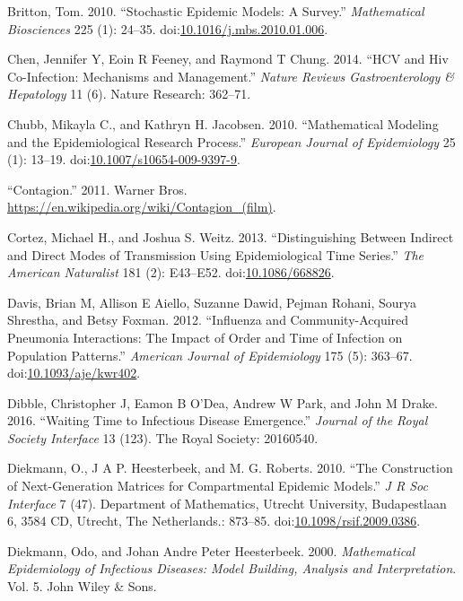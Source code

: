 \documentclass[]{book}
\theoremstyle{definition}
\theoremstyle{definition}
\theoremstyle{definition}
\theoremstyle{remark}
\begin{document}
\hypertarget{ref-britton10a}{}
Britton, Tom. 2010. ``Stochastic Epidemic Models: A Survey.''
\emph{Mathematical Biosciences} 225 (1): 24--35.
doi:\href{https://doi.org/10.1016/j.mbs.2010.01.006}{10.1016/j.mbs.2010.01.006}.

\hypertarget{ref-chen14}{}
Chen, Jennifer Y, Eoin R Feeney, and Raymond T Chung. 2014. ``HCV and
Hiv Co-Infection: Mechanisms and Management.'' \emph{Nature Reviews
Gastroenterology \& Hepatology} 11 (6). Nature Research: 362--71.

\hypertarget{ref-chubb10}{}
Chubb, Mikayla C., and Kathryn H. Jacobsen. 2010. ``Mathematical
Modeling and the Epidemiological Research Process.'' \emph{European
Journal of Epidemiology} 25 (1): 13--19.
doi:\href{https://doi.org/10.1007/s10654-009-9397-9}{10.1007/s10654-009-9397-9}.

\hypertarget{ref-contagionmovie}{}
``Contagion.'' 2011. Warner Bros.
\url{https://en.wikipedia.org/wiki/Contagion_(film)}.

\hypertarget{ref-cortez13}{}
Cortez, Michael H., and Joshua S. Weitz. 2013. ``Distinguishing Between
Indirect and Direct Modes of Transmission Using Epidemiological Time
Series.'' \emph{The American Naturalist} 181 (2): E43--E52.
doi:\href{https://doi.org/10.1086/668826}{10.1086/668826}.

\hypertarget{ref-davis12}{}
Davis, Brian M, Allison E Aiello, Suzanne Dawid, Pejman Rohani, Sourya
Shrestha, and Betsy Foxman. 2012. ``Influenza and Community-Acquired
Pneumonia Interactions: The Impact of Order and Time of Infection on
Population Patterns.'' \emph{American Journal of Epidemiology} 175 (5):
363--67.
doi:\href{https://doi.org/10.1093/aje/kwr402}{10.1093/aje/kwr402}.

\hypertarget{ref-dibble16}{}
Dibble, Christopher J, Eamon B O'Dea, Andrew W Park, and John M Drake.
2016. ``Waiting Time to Infectious Disease Emergence.'' \emph{Journal of
the Royal Society Interface} 13 (123). The Royal Society: 20160540.

\hypertarget{ref-diekmann10}{}
Diekmann, O., J A P. Heesterbeek, and M. G. Roberts. 2010. ``The
Construction of Next-Generation Matrices for Compartmental Epidemic
Models.'' \emph{J R Soc Interface} 7 (47). Department of Mathematics,
Utrecht University, Budapestlaan 6, 3584 CD, Utrecht, The Netherlands.:
873--85.
doi:\href{https://doi.org/10.1098/rsif.2009.0386}{10.1098/rsif.2009.0386}.

\hypertarget{ref-diekmann00}{}
Diekmann, Odo, and Johan Andre Peter Heesterbeek. 2000.
\emph{Mathematical Epidemiology of Infectious Diseases: Model Building,
Analysis and Interpretation}. Vol. 5. John Wiley \& Sons.
\end{document}
